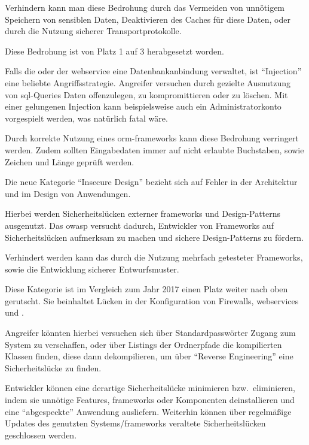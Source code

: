 	Verhindern kann man diese Bedrohung durch das Vermeiden von unnötigem Speichern von sensiblen Daten,
	Deaktivieren des Caches für diese Daten,
	oder durch die Nutzung sicherer Transportprotokolle.

	Diese Bedrohung ist von Platz 1 auf 3 herabgesetzt worden.

	Falls die \webApplication{} oder der \gls{webservice} eine Datenbankanbindung verwaltet,
	ist \enquote{Injection} eine beliebte Angriffsstrategie.
	Angreifer versuchen durch gezielte Ausnutzung von \gls{sql}-Queries Daten offenzulegen,
	zu kompromittieren oder zu löschen.
	Mit einer gelungenen Injection kann beispielsweise auch ein Administratorkonto vorgespielt werden,
	was natürlich fatal wäre.

	Durch korrekte Nutzung eines \gls{orm}-\glspl{framework} kann diese Bedrohung verringert werden.
	Zudem sollten Eingabedaten immer auf nicht erlaubte Buchstaben, sowie Zeichen und Länge geprüft werden.

	Die neue Kategorie \enquote{Insecure Design} bezieht sich auf Fehler in der Architektur und
	im Design von Anwendungen.

	Hierbei werden Sicherheitslücken externer \glspl{framework} und Design-Patterns ausgenutzt.
	Das \gls{owasp} versucht dadurch,
	Entwickler von Frameworks auf Sicherheitslücken aufmerksam zu machen und
	sichere Design-Patterns zu fördern.

	Verhindert werden kann das durch die Nutzung mehrfach getesteter Frameworks,
	sowie die Entwicklung sicherer Entwurfsmuster.

	Diese Kategorie ist im Vergleich zum Jahr 2017 einen Platz weiter nach oben gerutscht.
	Sie beinhaltet Lücken in der Konfiguration von Firewalls, \glspl{webservice}
	und \webApplications.

	Angreifer könnten hierbei versuchen sich über Standardpasswörter Zugang zum System zu verschaffen,
	oder über Listings der Ordnerpfade die kompilierten Klassen finden,
	diese dann dekompilieren,
	um über \enquote{Reverse Engineering} eine Sicherheitslücke zu finden.

	Entwickler können eine derartige Sicherheitslücke minimieren bzw.\ eliminieren,
	indem sie unnötige Features, \glspl{framework} oder Komponenten deinstallieren
	und eine \enquote{abgespeckte} Anwendung ausliefern.
	Weiterhin können über regelmäßige Updates des genutzten Systems/\glspl{framework}
	veraltete Sicherheitslücken geschlossen werden.

